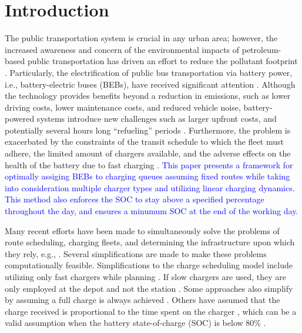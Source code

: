 \documentclass[utf8]{FrontiersinHarvard}
\let\cite\citep                                       %
\begin{document}
\section{Introduction}
\label{sec:introduction}
The public transportation system is crucial in any urban area; however, the increased awareness and concern of the
environmental impacts of petroleum-based public transportation has driven an effort to reduce the pollutant footprint
\cite{de-2014-simul-elect,xylia-2018-role-charg,guida-2017-zeeus-repor-europ,li-2016-batter-elect}. Particularly,
the electrification of public bus transportation via battery power, i.e., battery-electric buses (BEBs), have received
significant attention \cite{li-2016-batter-elect}. Although the technology provides benefits beyond a reduction in
emissions, such as lower driving costs, lower maintenance costs, and reduced vehicle noise, battery-powered systems
introduce new challenges such as larger upfront costs, and potentially several hours long ``refueling'' periods
\cite{xylia-2018-role-charg,li-2016-batter-elect}. Furthermore, the problem is exacerbated by the constraints of the
transit schedule to which the fleet must adhere, the limited amount of chargers available, and the adverse effects on
the health of the battery due to fast charging \cite{lutsey-2019-updat-elect}. \textcolor{blue}{This paper presents a framework for optimally assiging BEBs to charging queues assuming fixed routes while taking into consideration multiple charger types and utilizing linear charging dynamics. This method also enforces the SOC to stay above a specified percentage throughout the day, and ensures a minumum SOC at the end of the working day.}

Many recent efforts have been made to simultaneously solve the problems of route scheduling, charging fleets, and
determining the infrastructure upon which they rely, e.g., \cite{wei-2018-optim-spatio,sebastiani-2016-evaluat-elect,hoke-2014-accoun-lithium,wang-2017-elect-vehic}. Several simplifications are made to make these problems
computationally feasible. Simplifications to the charge scheduling model include utilizing only fast chargers while
planning \cite{wei-2018-optim-spatio,sebastiani-2016-evaluat-elect,wang-2017-optim-rechar,zhou-2020-bi-objec,yang-2018-charg-sched,wang-2017-elect-vehic,qin-2016-numer-analy,liu-2020-batter-elect}. If slow chargers are used,
they are only employed at the depot and not the station \cite{he-2020-optim-charg,tang-2019-robus-sched}. Some
approaches also simplify by assuming a full charge is always achieved
\cite{wei-2018-optim-spatio,wang-2017-elect-vehic,zhou-2020-bi-objec,wang-2017-optim-rechar}. Others have assumed
that the charge received is proportional to the time spent on the charger
\cite{liu-2020-batter-elect,yang-2018-charg-sched}, which can be a valid assumption when the battery state-of-charge
(SOC) is below 80\% \cite{liu-2020-batter-elect}.
\end{document}
